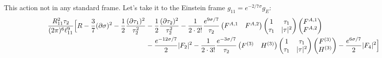 \documentclass[11pt, class=article, crop=false]{standalone}
\begin{document}
\begin{enumerate}
	This action not in any standard frame. Let's take it to the Einstein frame $g_{11} = e^{-2/7 \sigma} g_{E}$: 
	\[
	\begin{aligned}
		 \frac{R_{11}^2 \tau_2}{(2 \pi)^6 \ell_{11}^9} \Big[R - \frac37 (\partial\sigma)^2 - \frac12 \frac{(\partial \tau_1)^2}{\tau_2^2} &- \frac12 \frac{(\partial\tau_2)^2}{\tau_2^2} - \frac{1}{2\cdot 2!} \frac{e^{9\sigma/7}}{\tau_2} \begin{pmatrix}
			F^{A,1} & F^{A,2}
		\end{pmatrix}\begin{pmatrix}
			1 & \tau_1\\ \tau_1 & |\tau|^2
		\end{pmatrix}\begin{pmatrix}
			F^{A,1}\\ F^{A,2}
		\end{pmatrix} \\
		& - \frac{e^{-12\sigma/7}}{2} |F_2|^2
		 - \frac{1}{2 \cdot 3!}\frac{e^{-3\sigma/7}}{\tau_2} \begin{pmatrix}
			F^{(3)} & H^{(3)}
		\end{pmatrix}\begin{pmatrix}
			1 & \tau_1\\ \tau_1 & |\tau|^2
		\end{pmatrix}\begin{pmatrix}
			F^{(3)}\\ H^{(3)}
		\end{pmatrix}
		  -\frac{e^{6\sigma/7}}{2} |F_4|^2  \Big]
	\end{aligned}
	\]
	

\end{enumerate}
\end{document}

